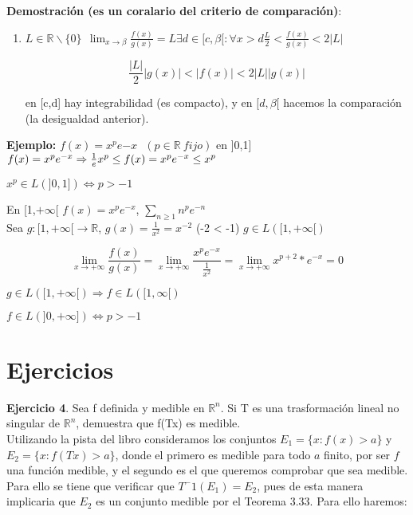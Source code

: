 \documentclass{article}
\begin{document}
\textbf{Demostración (es un coralario del criterio de comparación)}:
\begin{enumerate}[label=(\roman*)]
\item $L \in \mathbb{R}\backslash\{0\} \>\> \lim_{x \to \beta} \frac{f(x)}{g(x)}=L \exists d\in[c,\beta[: \forall x > d \frac{L}{2} < \frac{f(x)}{g(x)} < 2|L|$

\begin{equation*}
\frac{|L|}{2}|g(x)|<|f(x)| < 2|L||g(x)|
\end{equation*}

en [c,d] hay integrabilidad (es compacto), y en $[d,\beta[$ hacemos la comparación (la desigualdad anterior).

\end{enumerate}

\textbf{Ejemplo:}
$f(x) = x^p e{-x} \>\>\> (p \in \mathbb{R} \> fijo)$ en ]0,1] $f(x) = x^pe^{-x} \Rightarrow \\ \frac{1}{e}x^p \leq f(x) = x^pe^{-x} \leq x^p$

$x^p \in L(]0,1]) \Leftrightarrow p > -1$

En [1,$+\infty[$ $f(x)=x^pe^{-x}$, $\sum_{n \geq 1} n^pe^{-n}$ \\

Sea $g:[1,+\infty[ \rightarrow \mathbb{R}$, $g(x)=\frac{1}{x^2}=x^{-2}$ (-2 < -1) $g \in L([1,+\infty[)$

\begin{equation*}
\lim_{x \to +\infty} \frac{f(x)}{g(x)}=\lim_{x \to +\infty} \frac{x^pe^{-x}}{\frac{1}{x^2}}=\lim_{x \to +\infty} x^{p+2}*e^{-x}=0
\end{equation*}

$g \in L([1,+\infty[) \Rightarrow f \in L([1,\infty[)$

$f\in L(]0,+\infty]) \Leftrightarrow p > -1$
 




\section{Ejercicios}
\textbf{Ejercicio 4}. Sea f definida y medible en $\mathbb{R}^n$. Si T es una trasformación lineal no singular de $\mathbb{R}^n$, demuestra que f(Tx) es medible. \\

Utilizando la pista del libro consideramos los conjuntos $E_1=\{x: f(x) > a\}$ y $E_2=\{x: f(Tx) > a\}$, donde el primero es medible para todo $a$ finito, por ser $f$ una función medible, y el segundo es el que queremos comprobar que sea medible. Para ello se tiene que verificar que $T^-1(E_1)=E_2$, pues de esta manera implicaria que $E_2$ es un conjunto medible por el Teorema 3.33. Para ello haremos:
\end{document}
